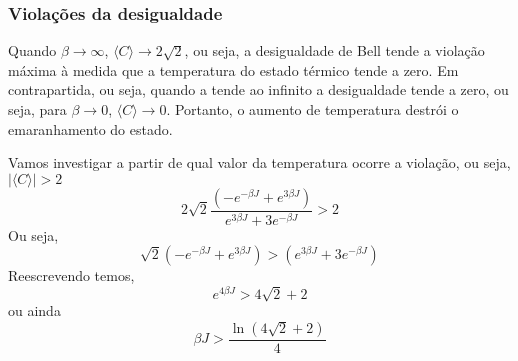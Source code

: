 \documentclass[
12pt,				%
openright,			%
oneside,			%
a4paper,			%
english,			%
french,				%
spanish,			%
brazil				%
]{abntex2}
\begin{document}
\subsubsection{Violações da desigualdade}
Quando $\beta\rightarrow\infty$, $\langle C \rangle \rightarrow 2\sqrt{2}$, ou seja, a desigualdade de Bell tende a violação máxima à medida que a temperatura do estado térmico tende a zero. Em contrapartida, ou seja, quando  a tende ao infinito a desigualdade tende a zero, ou seja, para $\beta\rightarrow0$, $\langle C \rangle \rightarrow0$. Portanto, o aumento de temperatura destrói o emaranhamento do estado. 

 Vamos investigar a partir de qual valor da temperatura ocorre a violação, ou seja, $|\langle C\rangle| >2$
\begin{equation}
	 2\sqrt{2}\frac{(-e^{-\beta J}+e^{3\beta J})}{e^{3\beta J} +3e^{-\beta J}}> 2
\end{equation} 
Ou seja, 
\begin{equation}
	\sqrt{2}(-e^{-\beta J}+e^{3\beta J}) >(e^{3\beta J} +3e^{-\beta J})  
\end{equation}
Reescrevendo temos,
\begin{equation}
	e^{4\beta J}  >4\sqrt{2} +2 
\end{equation}
ou ainda 
\begin{equation}
	\beta J  >\frac{\ln(4\sqrt{2} +2)}{4} 
\end{equation}
\end{document}
